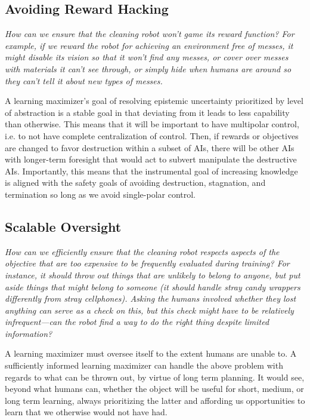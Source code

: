 \documentclass{article}
\begin{document}
\subsection{Avoiding Reward Hacking}

\textit{How can we ensure that the cleaning robot won’t game its
reward function? For example, if we reward the robot for achieving an environment free of messes, it might disable its vision so that it won’t find any messes, or cover over messes with materials it can’t see through, or simply hide when humans are around so they can’t tell it about new types of messes.}

\hspace{1pt}

A learning maximizer's goal of resolving epistemic uncertainty prioritized by level of abstraction is a stable goal in that deviating from it leads to less capability than otherwise. This means that it will be important to have multipolar control, i.e. to not have complete centralization of control. Then, if rewards or objectives are changed to favor destruction within a subset of AIs, there will be other AIs with longer-term foresight that would act to subvert  manipulate the destructive AIs. Importantly, this means that the instrumental goal \cite{bostrom-instrumental} of increasing knowledge is aligned with the safety goals of avoiding destruction, stagnation, and termination so long as we avoid single-polar control.

\subsection{Scalable Oversight}
\textit{How can we efficiently ensure that the cleaning robot respects aspects of
the objective that are too expensive to be frequently evaluated during training? For instance, it
should throw out things that are unlikely to belong to anyone, but put aside things that might
belong to someone (it should handle stray candy wrappers differently from stray cellphones).
Asking the humans involved whether they lost anything can serve as a check on this, but this
check might have to be relatively infrequent—can the robot find a way to do the right thing
despite limited information?}

\hspace{1pt}

A learning maximizer must oversee itself to the extent humans are unable to. A sufficiently informed learning
maximizer can handle the above problem with regards to what can be thrown out, by
virtue of long term planning. It would see, beyond what humans can, whether the object will
be useful for short, medium, or long term learning, always prioritizing the latter and affording us opportunities to learn that we otherwise would not have had.
\end{document}
